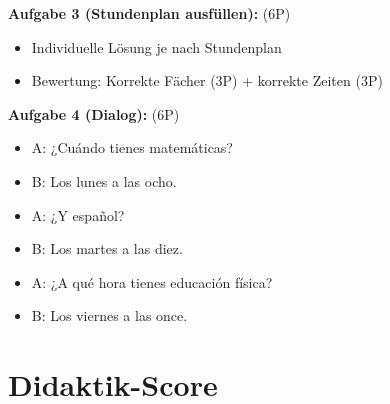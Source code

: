 \documentclass[11pt,a4paper]{article}
\begin{document}
\textbf{Aufgabe 3 (Stundenplan ausfüllen):} (6P)
\begin{itemize}
    \item Individuelle Lösung je nach Stundenplan
    \item Bewertung: Korrekte Fächer (3P) + korrekte Zeiten (3P)
\end{itemize}

\textbf{Aufgabe 4 (Dialog):} (6P)
\begin{itemize}
    \item A: ¿Cuándo tienes matemáticas?
    \item B: Los lunes a las ocho.
    \item A: ¿Y español?
    \item B: Los martes a las diez.
    \item A: ¿A qué hora tienes educación física?
    \item B: Los viernes a las once.
\end{itemize}

\newpage
\section{Didaktik-Score}
\end{document}
